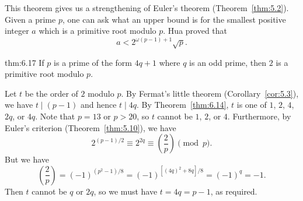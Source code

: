 This theorem gives us a strengthening of Euler's theorem (Theorem~\ref{thm:5.2}). 
Given a prime $p$, one can ask what an upper bound is for the smallest positive 
integer $a$ which is a primitive root modulo $p$. Hua proved that 
\[ a < 2^{\omega(p-1)+1} \sqrt{p}. \] 

\begin{theo}{thm:6.17}
    If $p$ is a prime of the form $4q+1$ where $q$ is an odd prime, then $2$ is a 
    primitive root modulo $p$. 
\end{theo}
\begin{pf}
    Let $t$ be the order of $2$ modulo $p$. By Fermat's little theorem 
    (Corollary~\ref{cor:5.3}), we have $t \mid (p-1)$ and hence $t \mid 4q$.
    By Theorem~\ref{thm:6.14}, $t$ is one of $1$, $2$, $4$, $2q$, or $4q$. 
    Note that $p = 13$ or $p > 20$, so $t$ cannot be $1$, $2$, or $4$. 
    Furthermore, by Euler's criterion (Theorem~\ref{thm:5.10}), we have 
    \[ 2^{(p-1)/2} \equiv 2^{2q} \equiv \left( \frac{2}{p} \right) \pmod p. \] 
    But we have 
    \[ \left( \frac{2}{p} \right) = (-1)^{(p^2-1)/8} = (-1)^{[(4q)^2+8q]/8}
    = (-1)^q = -1. \] 
    Then $t$ cannot be $q$ or $2q$, so we must have $t = 4q = p-1$, as required. 
\end{pf}
